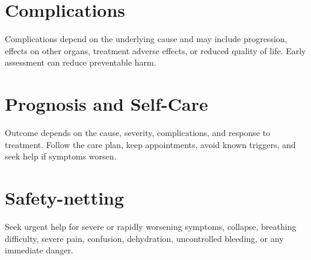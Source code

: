\section*{Complications}
Complications depend on the underlying cause and may include progression, effects on other organs, treatment adverse effects, or reduced quality of life. Early assessment can reduce preventable harm.

\section*{Prognosis and Self-Care}
Outcome depends on the cause, severity, complications, and response to treatment. Follow the care plan, keep appointments, avoid known triggers, and seek help if symptoms worsen.
\section*{Safety-netting}
Seek urgent help for severe or rapidly worsening symptoms, collapse, breathing difficulty, severe pain, confusion, dehydration, uncontrolled bleeding, or any immediate danger.
